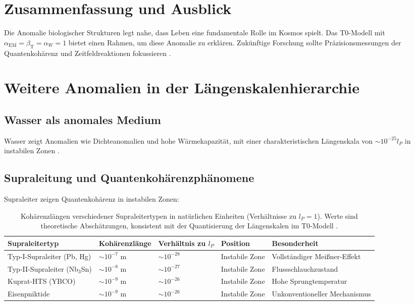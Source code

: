 \documentclass[12pt,a4paper]{article}
\begin{document}
	\section{Zusammenfassung und Ausblick}
	
	Die Anomalie biologischer Strukturen legt nahe, dass Leben eine fundamentale Rolle im Kosmos spielt. Das T0-Modell mit $\alpha_{\text{EM}} = \beta_{\text{T}} = \alpha_W = 1$ bietet einen Rahmen, um diese Anomalie zu erklären. Zukünftige Forschung sollte Präzisionsmessungen der Quantenkohärenz und Zeitfeldreaktionen fokussieren \cite{pascher_nateinheiten_2025}.
	
	\section{Weitere Anomalien in der Längenskalenhierarchie}
	
	\subsection{Wasser als anomales Medium}
	
	Wasser zeigt Anomalien wie Dichteanomalien und hohe Wärmekapazität, mit einer charakteristischen Längenskala von $\sim 10^{-25} l_P$ in instabilen Zonen \cite{pascher_nateinheiten_2025}.
	
	\subsection{Supraleitung und Quantenkohärenzphänomene}
	
	Supraleiter zeigen Quantenkohärenz in instabilen Zonen:
	
	\begin{table}[h]
		\centering
		\begin{adjustbox}{scale=0.75}
			\begin{tabular}{lllll}
				\hline
				\textbf{Supraleitertyp} & \textbf{Kohärenzlänge} & \textbf{Verhältnis zu $l_P$} & \textbf{Position} & \textbf{Besonderheit} \\
				\hline
				Typ-I-Supraleiter (Pb, Hg) & $\sim 10^{-7}$ m & $\sim 10^{-28}$ & Instabile Zone & Vollständiger Meißner-Effekt \\
				Typ-II-Supraleiter (Nb$_3$Sn) & $\sim 10^{-8}$ m & $\sim 10^{-27}$ & Instabile Zone & Flussschlauchzustand \\
				Kuprat-HTS (YBCO) & $\sim 10^{-9}$ m & $\sim 10^{-26}$ & Instabile Zone & Hohe Sprungtemperatur \\
				Eisenpniktide & $\sim 10^{-9}$ m & $\sim 10^{-26}$ & Instabile Zone & Unkonventioneller Mechanismus \\
				\hline
			\end{tabular}
		\end{adjustbox}
		\caption{Kohärenzlängen verschiedener Supraleitertypen in natürlichen Einheiten (Verhältnisse zu $l_P = 1$). Werte sind theoretische Abschätzungen, konsistent mit der Quantisierung der Längenskalen im T0-Modell \cite{pascher_nateinheiten_2025}.}
		\label{tab:supercond}
	\end{table}
	
\end{document}
